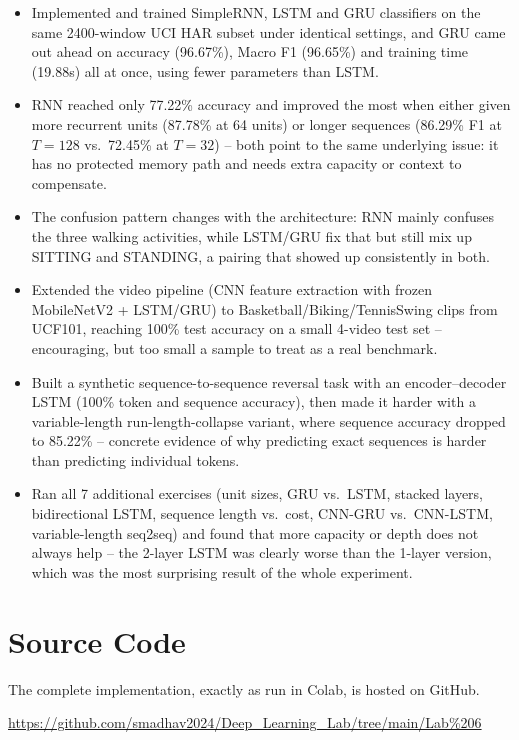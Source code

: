 \documentclass[10pt]{article}
\begin{document}
\begin{itemize}
\item Implemented and trained SimpleRNN, LSTM and GRU classifiers on the same
2400-window UCI HAR subset under identical settings, and GRU came out ahead
on accuracy (96.67\%), Macro F1 (96.65\%) and training time (19.88s) all at
once, using fewer parameters than LSTM.
\item RNN reached only 77.22\% accuracy and improved the most when either
given more recurrent units (87.78\% at 64 units) or longer sequences
(86.29\% F1 at $T{=}128$ vs.\ 72.45\% at $T{=}32$) -- both point to the same
underlying issue: it has no protected memory path and needs extra capacity
or context to compensate.
\item The confusion pattern changes with the architecture: RNN mainly
confuses the three walking activities, while LSTM/GRU fix that but still mix
up SITTING and STANDING, a pairing that showed up consistently in both.
\item Extended the video pipeline (CNN feature extraction with frozen
MobileNetV2 + LSTM/GRU) to Basketball/Biking/TennisSwing clips from UCF101,
reaching 100\% test accuracy on a small 4-video test set -- encouraging, but
too small a sample to treat as a real benchmark.
\item Built a synthetic sequence-to-sequence reversal task with an
encoder--decoder LSTM (100\% token and sequence accuracy), then made it
harder with a variable-length run-length-collapse variant, where sequence
accuracy dropped to 85.22\% -- concrete evidence of why predicting exact
sequences is harder than predicting individual tokens.
\item Ran all 7 additional exercises (unit sizes, GRU vs.\ LSTM, stacked
layers, bidirectional LSTM, sequence length vs.\ cost, CNN-GRU vs.\ CNN-LSTM,
variable-length seq2seq) and found that more capacity or depth does not
always help -- the 2-layer LSTM was clearly worse than the 1-layer version,
which was the most surprising result of the whole experiment.
\end{itemize}

\section*{Source Code}

The complete implementation, exactly as run in Colab, is hosted on GitHub.

\url{https://github.com/smadhav2024/Deep_Learning_Lab/tree/main/Lab%206}
\end{document}
